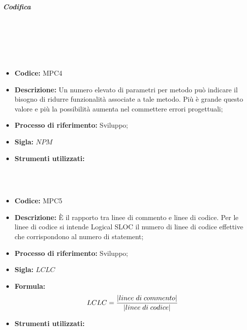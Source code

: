\subparagraph{Codifica}\mbox{}\\ \\
    \mbox{}\\ \\
    \begin{itemize}
        \item \textbf{Codice:} MPC4
        \item \textbf{Descrizione:} Un numero elevato di parametri per metodo può indicare il bisogno di ridurre funzionalità associate a tale metodo. Più è grande questo valore e più la possibilità aumenta nel commettere errori progettuali;
        \item \textbf{Processo di riferimento:} Sviluppo;
        \item \textbf{Sigla:} $NPM$
        \item \textbf{Strumenti utilizzati:}
    \end{itemize}

    \mbox{}\\ \\
    \begin{itemize}
        \item \textbf{Codice:} MPC5
        \item \textbf{Descrizione:} È il rapporto tra linee di commento e linee di codice. Per le linee di codice si intende Logical SLOC il numero di linee di codice effettive che corrispondono al numero di statement;
        \item \textbf{Processo di riferimento:} Sviluppo;
        \item \textbf{Sigla:} $LCLC$
        \item \textbf{Formula:}$$LCLC = {|linee \; di \; commento| \over |linee \; di \; codice|}$$
        \item \textbf{Strumenti utilizzati:}
    \end{itemize}
